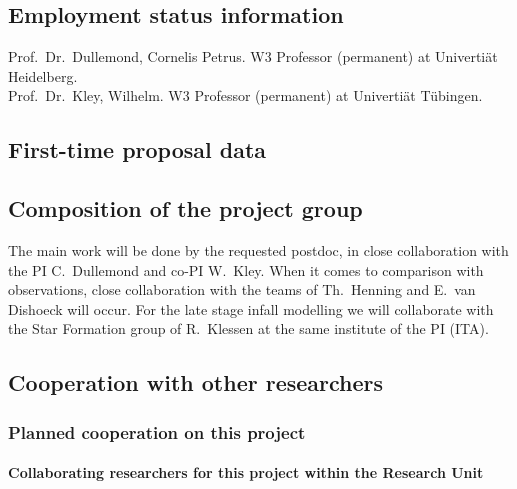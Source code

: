 \documentclass[10pt,fleqn,twoside]{article}
\begin{document}
\subsection{Employment status information}
Prof.~Dr.~Dullemond, Cornelis Petrus.
W3 Professor (permanent) at Univerti\"at Heidelberg.\\
Prof.~Dr.~Kley, Wilhelm.
W3 Professor (permanent) at Univerti\"at T\"ubingen.


\subsection{First-time proposal data}

\subsection{Composition of the project group}

The main work will be done by the requested postdoc, in close collaboration
with the PI C.~Dullemond and co-PI W.~Kley. When it comes to comparison with
observations, close collaboration with the teams of Th.~Henning and E.~van
Dishoeck will occur. For the late stage infall modelling we will collaborate
with the Star Formation group of R.~Klessen at the same institute of the PI
(ITA). 

\subsection{Cooperation with other researchers}

\subsubsection{Planned cooperation on this project}

\paragraph{Collaborating researchers for this project within the
  Research Unit}
\end{document}
